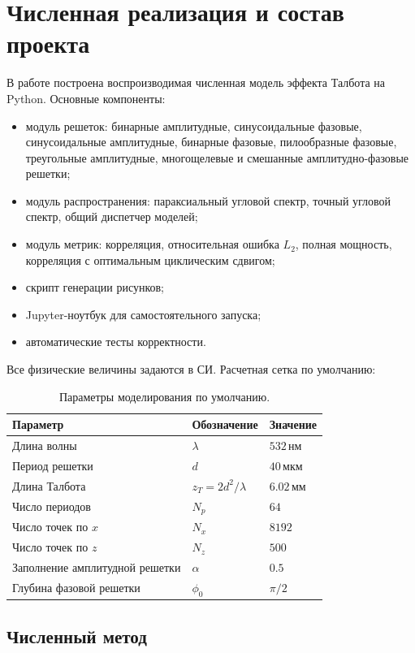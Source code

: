 \documentclass[12pt,a4paper]{article}
\begin{document}
\section{Численная реализация и состав проекта}

В работе построена воспроизводимая численная модель эффекта Талбота на Python. Основные компоненты:
\begin{itemize}
    \item модуль решеток: бинарные амплитудные, синусоидальные фазовые, синусоидальные амплитудные, бинарные фазовые, пилообразные фазовые, треугольные амплитудные, многощелевые и смешанные амплитудно-фазовые решетки;
    \item модуль распространения: параксиальный угловой спектр, точный угловой спектр, общий диспетчер моделей;
    \item модуль метрик: корреляция, относительная ошибка $L_2$, полная мощность, корреляция с оптимальным циклическим сдвигом;
    \item скрипт генерации рисунков;
    \item Jupyter-ноутбук для самостоятельного запуска;
    \item автоматические тесты корректности.
\end{itemize}

Все физические величины задаются в СИ. Расчетная сетка по умолчанию:
\begin{table}[H]
\centering
\begin{tabular}{lll}
\toprule
Параметр & Обозначение & Значение\\
\midrule
Длина волны & $\lambda$ & $532\,\text{нм}$\\
Период решетки & $d$ & $40\,\text{мкм}$\\
Длина Талбота & $z_T=2d^2/\lambda$ & $6.02\,\text{мм}$\\
Число периодов & $N_p$ & $64$\\
Число точек по $x$ & $N_x$ & $8192$\\
Число точек по $z$ & $N_z$ & $500$\\
Заполнение амплитудной решетки & $\alpha$ & $0.5$\\
Глубина фазовой решетки & $\phi_0$ & $\pi/2$\\
\bottomrule
\end{tabular}
\caption{Параметры моделирования по умолчанию.}
\end{table}

\subsection{Численный метод}
\end{document}
